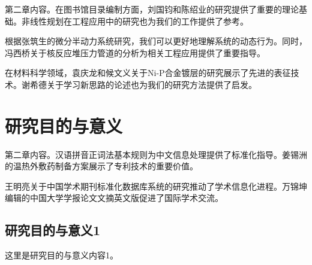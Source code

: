 第二章内容。在图书馆目录编制方面，刘国钧和陈绍业的研究\cite{liu1997library}提供了重要的理论基础。非线性规划在工程应用中的研究\cite{zhong1996nonlinear}也为我们的工作提供了参考。

根据张筑生的微分半动力系统研究\cite{zhang1983differential}，我们可以更好地理解系统的动态行为。同时，冯西桥关于核反应堆压力管道的分析\cite{feng1997lbb}为相关工程应用提供了重要指导。

在材料科学领域，袁庆龙和候文义关于Ni-P合金镀层的研究\cite{yuan2001ni}展示了先进的表征技术。谢希德关于学习新思路的论述\cite{xie1998learning}也为我们的研究方法提供了启发。

\section{研究目的与意义}
第二章内容。汉语拼音正词法基本规则\cite{gb1996pinyin}为中文信息处理提供了标准化指导。姜锡洲的温热外敷药制备方案\cite{jiang1989pharmaceutical}展示了专利技术的重要价值。

王明亮关于中国学术期刊标准化数据库系统的研究\cite{wang1998chinese}推动了学术信息化进程。万锦坤编辑的中国大学学报论文文摘英文版\cite{wan1996chinese}促进了国际学术交流。

\subsection{研究目的与意义1}
这里是研究目的与意义内容1。
\fi